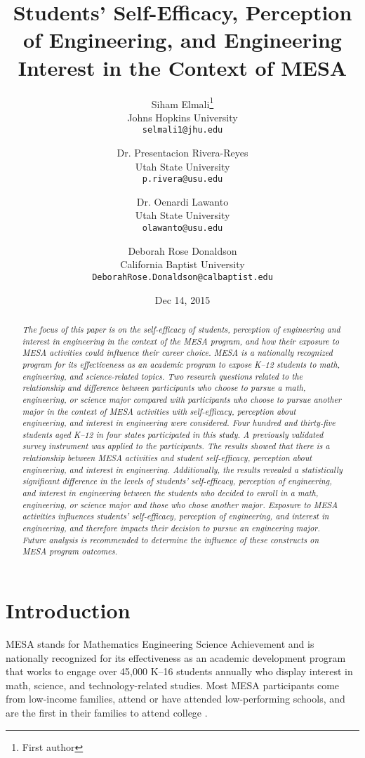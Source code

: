 \documentclass[11pt]{article}
\title{Students’ Self-Efficacy, Perception of Engineering, and Engineering Interest in the Context of MESA}
\author{
    Siham Elmali\thanks{First author} \\
    Johns Hopkins University \\
    \texttt{selmali1@jhu.edu}
    \and
    Dr. Presentacion Rivera-Reyes \\
    Utah State University \\
    \texttt{p.rivera@usu.edu}
    \and
    Dr. Oenardi Lawanto \\
    Utah State University \\
    \texttt{olawanto@usu.edu}
    \and
    Deborah Rose Donaldson\footnotemark[1] \\
    California Baptist University \\
    \texttt{DeborahRose.Donaldson@calbaptist.edu}
}
\date{Dec 14, 2015}
\begin{document}
\maketitle
\begin{abstract}
\small
{}
\itshape
The focus of this paper is on the self-efficacy of students, perception of engineering and interest in engineering in the context of the MESA program, and how their exposure to MESA activities could influence their career choice. MESA is a nationally recognized program for its effectiveness as an academic program to expose K--12 students to math, engineering, and science-related topics. Two research questions related to the relationship and difference between participants who choose to pursue a math, engineering, or science major compared with participants who choose to pursue another major in the context of MESA activities with self-efficacy, perception about engineering, and interest in engineering were considered. Four hundred and thirty-five students aged K--12 in four states participated in this study. A previously validated survey instrument was applied to the participants. The results showed that there is a relationship between MESA activities and student self-efficacy, perception about engineering, and interest in engineering. Additionally, the results revealed a statistically significant difference in the levels of students’ self-efficacy, perception of engineering, and interest in engineering between the students who decided to enroll in a math, engineering, or science major and those who chose another major. Exposure to MESA activities influences students' self-efficacy, perception of engineering, and interest in engineering, and therefore impacts their decision to pursue an engineering major. Future analysis is recommended to determine the influence of these constructs on MESA program outcomes.
\end{abstract}



\section{Introduction}

MESA stands for Mathematics Engineering Science Achievement and is nationally recognized for its effectiveness as an academic development program that works to engage over 45,000 K--16 students annually who display interest in math, science, and technology-related studies. Most MESA participants come from low-income families, attend or have attended low-performing schools, and are the first in their families to attend college \cite{mesa2014}.
\end{document}

